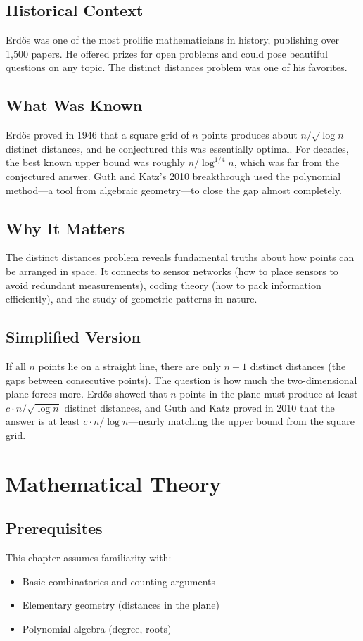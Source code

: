 \subsection{Historical Context}
Erd\H{o}s was one of the most prolific mathematicians in history, publishing over 1,500 papers. He offered prizes for open problems and could pose beautiful questions on any topic. The distinct distances problem was one of his favorites.

\subsection{What Was Known}
Erd\H{o}s proved in 1946 that a square grid of $n$ points produces about $n/\sqrt{\log n}$ distinct distances, and he conjectured this was essentially optimal. For decades, the best known upper bound was roughly $n/\log^{1/4} n$, which was far from the conjectured answer. Guth and Katz's 2010 breakthrough used the polynomial method---a tool from algebraic geometry---to close the gap almost completely.

\subsection{Why It Matters}
The distinct distances problem reveals fundamental truths about how points can be arranged in space. It connects to sensor networks (how to place sensors to avoid redundant measurements), coding theory (how to pack information efficiently), and the study of geometric patterns in nature.

\subsection{Simplified Version}
If all $n$ points lie on a straight line, there are only $n-1$ distinct distances (the gaps between consecutive points). The question is how much the two-dimensional plane forces more. Erdős showed that $n$ points in the plane must produce at least $c \cdot n/\sqrt{\log n}$ distinct distances, and Guth and Katz proved in 2010 that the answer is at least $c \cdot n/\log n$---nearly matching the upper bound from the square grid.

\section{Mathematical Theory}


\subsection{Prerequisites}
This chapter assumes familiarity with:
\begin{itemize}
\item Basic combinatorics and counting arguments
\item Elementary geometry (distances in the plane)
\item Polynomial algebra (degree, roots)
\end{itemize}

